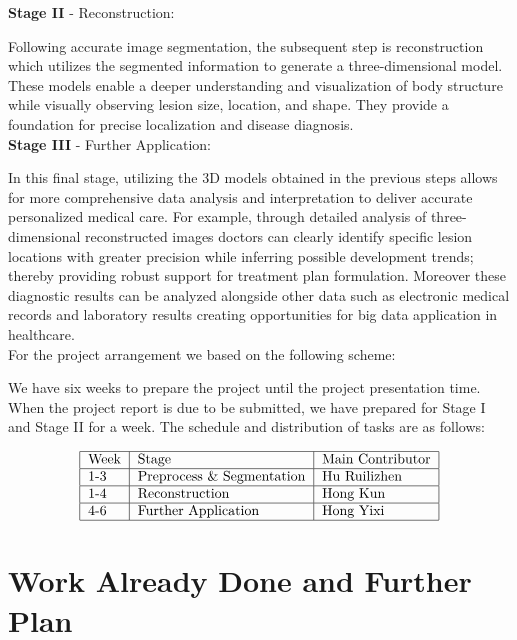 \documentclass[12pt,a4paper]{report}
\begin{document}
\textbf{Stage II} - Reconstruction:

\qquad Following accurate image segmentation, the subsequent step is reconstruction which utilizes the segmented information to generate a three-dimensional model. These models enable a deeper understanding
and visualization of body structure while visually observing lesion size, location, and shape. They provide a foundation for precise localization and disease diagnosis.\\

\textbf{Stage III} - Further Application:

\qquad In this final stage, utilizing the 3D models obtained in the previous steps allows for more comprehensive data analysis and interpretation to deliver accurate personalized medical care. For example,
through detailed analysis of three-dimensional reconstructed images doctors can clearly identify specific lesion locations with greater precision while inferring possible development trends; thereby providing
robust support for treatment plan formulation. Moreover these diagnostic results can be analyzed alongside other data such as electronic medical records and laboratory results creating opportunities for big
data application in healthcare.\\

For the project arrangement we based on the following scheme:

\qquad We have six weeks to prepare the project until the project presentation time. When the project report is due to be submitted, we have prepared for Stage I and Stage II for a week.
The schedule and distribution of tasks are as follows:

$$
    \begin{tabular}{|l|l|l|}
        \hline
        Week & Stage                      & Main Contributor \\
        \hline
        1-3  & Preprocess \& Segmentation & Hu Ruilizhen     \\
        \hline
        1-4  & Reconstruction             & Hong Kun         \\
        \hline
        4-6  & Further Application        & Hong Yixi        \\
        \hline
    \end{tabular}
$$

\section{Work Already Done and Further Plan}
\end{document}
